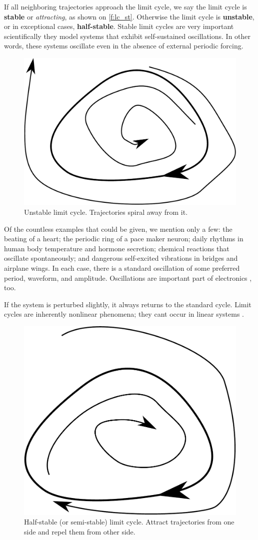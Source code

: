 \documentclass[journal]{IEEEtran}
\begin{document}
If all neighboring trajectories approach the limit cycle, we say the limit cycle is \textbf{stable} or \textit{attracting}, as shown on \cref{f:lc_st}. Otherwise the limit cycle is \textbf{unstable}, or in exceptional cases, \textbf{half-stable}. Stable  limit cycles are very important scientifically they model systems that exhibit self-sustained oscillations. In other words, these systems oscillate even in the absence of external periodic forcing. 

\begin{figure}[ht!]
	\centering
	\includegraphics[width=.55\linewidth]{lcycle_unstable}
	\caption{Unstable limit cycle. Trajectories spiral away from it.}
	\label{f:lc_unst}
\end{figure}

Of the countless examples that could be given, we mention only a few: the beating of a heart; the periodic ring of a pace maker neuron; daily rhythms in human body temperature and hormone secretion; chemical reactions that oscillate spontaneously; and dangerous self-excited vibrations in bridges and airplane wings. In each case, there is a standard oscillation of some preferred period, waveform, and amplitude. Oscillations are important part of electronics \cite{oscillations}, too.

If the system is perturbed slightly, it always returns to the standard cycle. Limit cycles are inherently nonlinear phenomena; they cant occur in linear systems \cite{strogatz2008nonlinear} \cite{strogatz1994nonlinear}.

\begin{figure}[ht!]
	\centering
	\includegraphics[width=.5\linewidth]{lcycle_hstable}
	\caption{Half-stable (or semi-stable) limit cycle. Attract trajectories from one side and repel them from other side.}
	\label{f:lc_hst}
\end{figure}
\end{document}
